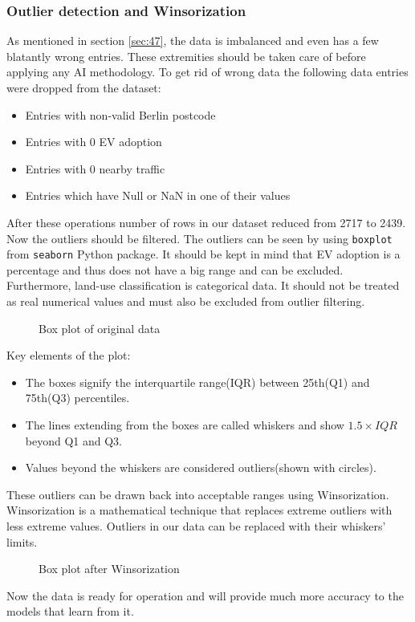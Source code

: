 \subsubsection{Outlier detection and Winsorization}
As mentioned in section \ref{sec:47}, the data is imbalanced and even has a few blatantly wrong entries. These extremities should be taken care of before applying any AI methodology. To get rid of wrong data the following data entries were dropped from the dataset:
\begin{itemize}
    \item Entries with non-valid Berlin postcode
    \item Entries with 0 EV adoption
    \item Entries with 0 nearby traffic
    \item Entries which have Null or NaN in one of their values
\end{itemize}
After these operations number of rows in our dataset reduced from 2717 to 2439. Now the outliers should be filtered. The outliers can be seen by using \verb|boxplot| from \verb|seaborn| Python package. It should be kept in mind that EV adoption is a percentage and thus does not have a big range and can be excluded. Furthermore, land-use classification is categorical data. It should not be treated as real numerical values and must also be excluded from outlier filtering.\\
\begin{figure}[H]
\begin{center}

\caption{Box plot of original data}
\end{center}
\end{figure}
Key elements of the plot:
\begin{itemize}
    \item The boxes signify the interquartile range(\gls{IQR}) between 25th(\gls{Q1}) and 75th(\gls{Q3}) percentiles.
    \item The lines extending from the boxes are called whiskers and show $1.5 \times IQR$ beyond Q1 and Q3. 
    \item Values beyond the whiskers are considered outliers(shown with circles).
\end{itemize}
These outliers can be drawn back into acceptable ranges using Winsorization. Winsorization is a mathematical technique that replaces extreme outliers with less extreme values. Outliers in our data can be replaced with their whiskers' limits.
\begin{figure}[H]

\begin{center}

\caption{Box plot after Winsorization}
\end{center}
\end{figure}
Now the data is ready for operation and will provide much more accuracy to the models that learn from it.

